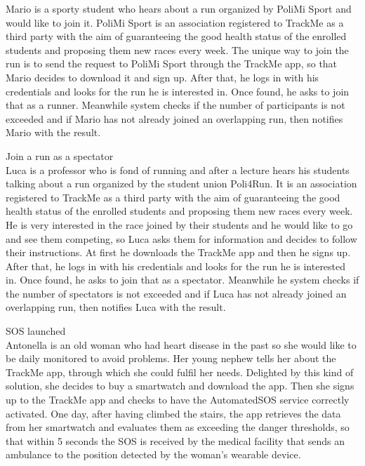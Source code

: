 \documentclass{article}
\begin{document}
\begin{legal}
\begin{legal}
\begin{legal}
{\begin{legal}
Mario is a sporty student who hears about a run organized by PoliMi Sport and would like to join it. PoliMi Sport is an association registered to TrackMe as a third party with the aim of guaranteeing the good health status of the enrolled students and proposing them new races every week. The unique way to join the run is to send the request to PoliMi Sport through the TrackMe app, so that Mario decides to download it and sign up. After that, he logs in with his credentials and looks for the run he is interested in. Once found, he asks to join that as a runner. Meanwhile system checks if the number of participants is not exceeded and if Mario has not already joined an overlapping run, then notifies Mario with the result.\\

		\item Join a run as a spectator\\

Luca is a professor who is fond of running and after a lecture hears his students talking about a run organized by the student union Poli4Run. It is an association registered to TrackMe as a third party with the aim of guaranteeing the good health status of the enrolled students and proposing them new races every week. He is very interested in the race joined by their students and he would like to go and see them competing, so Luca asks them for information and decides to follow their instructions. At first he downloads the TrackMe app and then he signs up. After that, he logs in with his credentials and looks for the run he is interested in. Once found, he asks to join that as a spectator. Meanwhile he system checks if the number of spectators is not exceeded and if Luca has not already joined an overlapping run, then notifies Luca with the result.\\

		\item SOS launched\\

Antonella is an old woman who had heart disease in the past so she would like to be daily monitored to avoid problems. Her young nephew tells her about the TrackMe app, through which she could fulfil her needs. Delighted by this kind of solution, she decides to buy a smartwatch and download the app. Then she signs up to the TrackMe app and checks to have the AutomatedSOS service correctly activated. One day, after having climbed the stairs, the app retrieves the data from her smartwatch and evaluates them as exceeding the danger thresholds, so that within 5 seconds the SOS is received by the medical facility that sends an ambulance to the position detected by the woman’s wearable device.\\



\end{legal}}
\end{legal}
\end{legal}
\end{legal}
\end{document}
